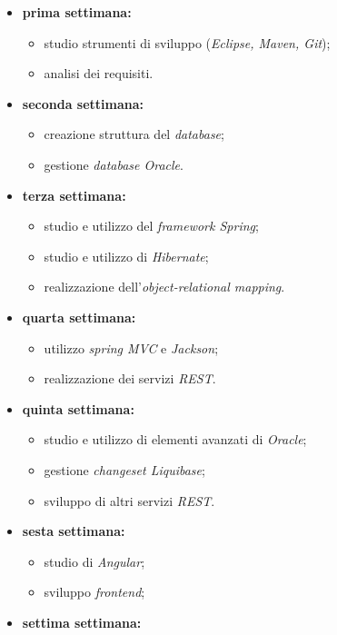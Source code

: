 \begin{itemize}
    \item \textbf{prima settimana:}
    \begin{itemize}
        \item studio strumenti di sviluppo (\textit{Eclipse, Maven, Git});
        \item analisi dei requisiti.
    \end{itemize}
    \item \textbf{seconda settimana:}
    \begin{itemize}
        \item creazione struttura del \textit{database};
        \item gestione \textit{database Oracle}.
    \end{itemize}
    \item \textbf{terza settimana:}
    \begin{itemize}
        \item studio e utilizzo del \textit{framework Spring};
        \item studio e utilizzo di \textit{Hibernate};
        \item realizzazione dell'\textit{object-relational mapping}. 
    \end{itemize}
    \item \textbf{quarta settimana:}
    \begin{itemize}
        \item utilizzo \textit{spring MVC} e \textit{Jackson};
        \item realizzazione dei servizi \textit{REST}.
    \end{itemize}
    \item \textbf{quinta settimana:}
    \begin{itemize}
        \item studio e utilizzo di elementi avanzati di \textit{Oracle};
        \item gestione \textit{changeset Liquibase};
        \item sviluppo di altri servizi \textit{REST}. 
    \end{itemize}
    \item \textbf{sesta settimana:}
    \begin{itemize}
        \item studio di \textit{Angular};
        \item sviluppo \textit{frontend};
    \end{itemize}
    \item \textbf{settima settimana:}

\end{itemize}
